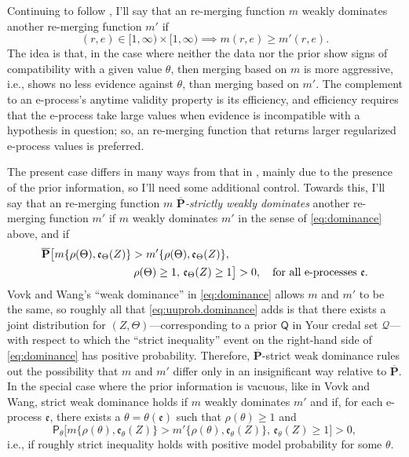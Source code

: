 \documentclass[a4paper, 12pt]{article}
\theoremstyle{plain}
\theoremstyle{definition}
\theoremstyle{remark}
\newcommand{\prob}{\mathsf{P}}
\newcommand{\prior}{\mathsf{Q}}
\newcommand{\credal}{\mathscr{Q}}
\newcommand{\uuprob}{\mathbf{\overline{P}}}
\newcommand{\eval}{\mathfrak{e}}
\begin{document}
Continuing to follow \citet{vovk.wang.2021}, I'll say that an re-merging function $m$ weakly dominates another re-merging function $m'$ if 
\begin{equation}
\label{eq:dominance}
(r,e) \in [1, \infty) \times [1, \infty) \implies m(r,e) \geq m'(r,e). 
\end{equation}
The idea is that, in the case where neither the data nor the prior show signs of compatibility with a given value $\theta$, then merging based on $m$ is more aggressive, i.e., shows no less evidence against $\theta$, than merging based on $m'$.  The complement to an e-process's anytime validity property is its efficiency, and efficiency requires that the e-process take large values when evidence is incompatible with a hypothesis in question; so, an re-merging function that returns larger regularized e-process values is preferred.  

The present case differs in many ways from that in \citet{vovk.wang.2021}, mainly due to the presence of the prior information, so I'll need some additional control.  Towards this, I'll say that an re-merging function $m$ {\em $\uuprob$-strictly weakly dominates} another re-merging function $m'$ if $m$ weakly dominates $m'$ in the sense of \eqref{eq:dominance} above, and if
\begin{align}
\uuprob \bigl[ m\{ \rho(\Theta), \eval_\Theta(Z) \} > m'\{ \rho(\Theta), \eval_\Theta(Z) \}, \; & \notag \\
\rho(\Theta) \geq 1, \, \eval_\Theta(Z) \geq 1 & \bigr] > 0, \quad \text{for all e-processes $\eval$}. \label{eq:uuprob.dominance}
\end{align}
Vovk and Wang's ``weak dominance'' in \eqref{eq:dominance} allows $m$ and $m'$ to be the same, so roughly all that \eqref{eq:uuprob.dominance} adds is that there exists a joint distribution for $(Z,\Theta)$---corresponding to a prior $\prior$ in Your credal set $\credal$---with respect to which the ``strict inequality'' event on the right-hand side of \eqref{eq:dominance} has positive probability.  Therefore, $\uuprob$-strict weak dominance rules out the possibility that $m$ and $m'$ differ only in an insignificant way relative to $\uuprob$.  In the special case where the prior information is vacuous, like in Vovk and Wang, strict weak dominance holds if $m$ weakly dominates $m'$ and if, for each e-process $\eval$, there exists a $\theta=\theta(\eval)$ such that $\rho(\theta) \geq 1$ and
\[ \prob_\theta\bigl[ m\{ \rho(\theta), \eval_\theta(Z) \} > m'\{ \rho(\theta), \eval_\theta(Z) \}, \, \eval_\theta(Z) \geq 1 \bigr] > 0, \]
i.e., if roughly strict inequality holds with positive model probability for some $\theta$.  
\end{document}
